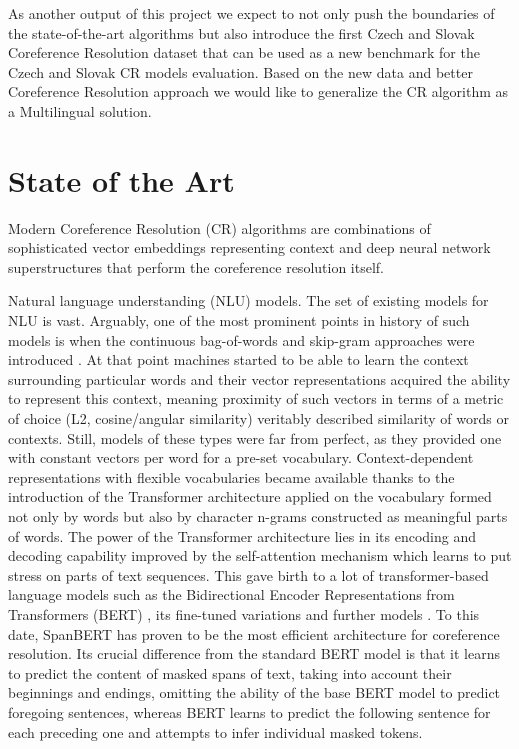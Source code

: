 As another output of this project we expect to not only push the boundaries of the state-of-the-art algorithms but also introduce the first Czech and Slovak Coreference Resolution dataset that can be used as a new benchmark for the Czech and Slovak CR models evaluation. Based on the new data and better Coreference Resolution approach  we would like to generalize the CR algorithm as a Multilingual solution.


\section{State of the Art}\label{sec:sota}

Modern Coreference Resolution (CR) algorithms are combinations of sophisticated vector embeddings representing context and deep neural network superstructures that perform the coreference resolution itself. 

Natural language understanding (NLU) models. 
The set of existing models for NLU is vast. 
Arguably, one of the most prominent points in history of such models is when the continuous bag-of-words and skip-gram approaches were introduced \cite{w2v-Mikolov2013}. 
At that point machines started to be able to learn the context surrounding particular words and their vector representations  acquired the ability to represent this context, meaning proximity of such vectors in terms of a metric of choice (L2, cosine/angular similarity) veritably described similarity of words or contexts. 
Still, models of these types were far from perfect, as they provided one with constant vectors per word for a pre-set vocabulary. 
Context-dependent representations with flexible vocabularies became available thanks to the introduction of the Transformer architecture \cite{transformer-Vaswani2017} applied on the vocabulary formed not only by words but also by character n-grams constructed as meaningful parts of words.  
The power of the Transformer architecture lies in its encoding and decoding capability improved by the self-attention mechanism which learns to put stress on parts of text sequences. 
This gave birth to a lot of transformer-based language models such as the Bidirectional Encoder Representations from Transformers (BERT) \cite{bert-Devlin2019}, its fine-tuned variations \cite{albert-Lan2020,robarta-Liu2019} and further models \cite{gpt-Radford2018,use-Cer2018}. 
To this date, SpanBERT \cite{spanbert-Joshi2020} has proven to be the most efficient architecture for coreference resolution. 
Its crucial difference from the standard BERT model is that it learns to predict the content of masked spans of text, taking into account their beginnings and endings, omitting the ability of the base BERT model to predict foregoing  sentences, whereas BERT learns to predict the following sentence for each preceding one and attempts to infer individual masked tokens. 